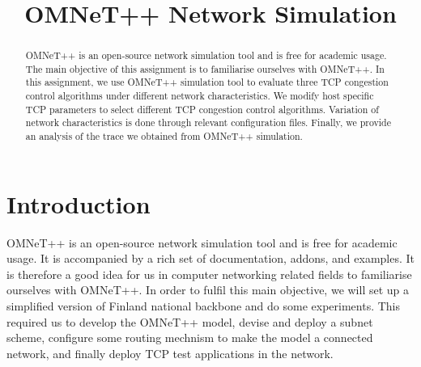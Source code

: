 \documentclass[conference,a4paper]{IEEEtran}
\begin{document}
%
\title{OMNeT++ Network Simulation}


\author{
}


\maketitle


\begin{abstract}

OMNeT++ is an open-source network simulation tool and is free for academic usage.
The main objective of this assignment is to familiarise ourselves with OMNeT++.
In this assignment, we use OMNeT++ simulation tool to evaluate three TCP congestion control algorithms under different network characteristics.
We modify host specific TCP parameters to select different TCP congestion control algorithms.
Variation of network characteristics is done through relevant configuration files.
Finally, we provide an analysis of the trace we obtained from OMNeT++ simulation.

\end{abstract}




\section{Introduction}

OMNeT++ is an open-source network simulation tool and is free for academic usage.
It is accompanied by a rich set of documentation, addons, and examples.
It is therefore a good idea for us in computer networking related fields to familiarise ourselves with OMNeT++.
In order to fulfil this main objective, we will set up a simplified version of Finland national backbone and do some experiments.
This required us to develop the OMNeT++ model, devise and deploy a subnet scheme, configure some routing mechnism to make the model a connected network, and finally deploy TCP test applications in the network.
\end{document}
